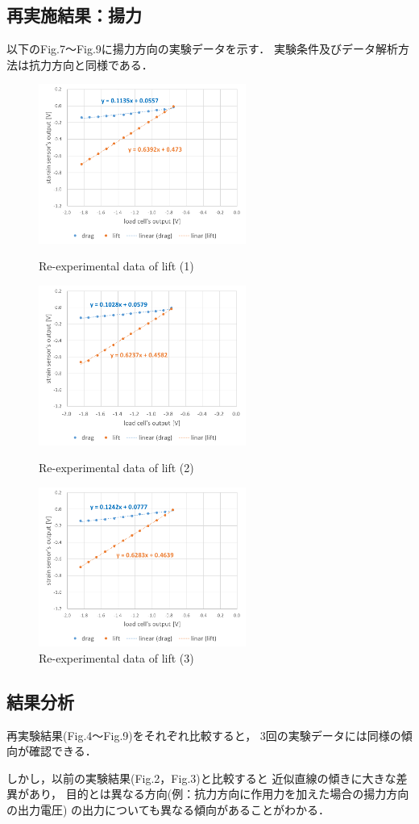 \documentclass[twocolumn,a4j]{jsarticle}
\begin{document}
\subsection{再実施結果：揚力}
以下のFig.7～Fig.9に揚力方向の実験データを示す．
実験条件及びデータ解析方法は抗力方向と同様である．
\begin{figure}[htbp]
    \footnotesize
    \begin{center}
        \includegraphics[width=68mm]{../images/graph_21119_lift_1.png}
        \caption{Re-experimental data of lift (1)}
        \includegraphics[width=68mm]{../images/graph_21119_lift_2.png}
        \caption{Re-experimental data of lift (2)}
        \includegraphics[width=68mm]{../images/graph_21119_lift_3.png}
        \caption{Re-experimental data of lift (3)}
    \end{center}
\end{figure}

\newpage

\subsection{結果分析}
再実験結果(Fig.4～Fig.9)をそれぞれ比較すると，
3回の実験データには同様の傾向が確認できる．\par
しかし，以前の実験結果(Fig.2，Fig.3)と比較すると
近似直線の傾きに大きな差異があり，
目的とは異なる方向(例：抗力方向に作用力を加えた場合の揚力方向の出力電圧)
の出力についても異なる傾向があることがわかる．
\end{document}
